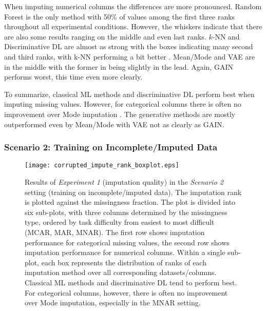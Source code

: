 When imputing numerical columns the differences are more pronounced. Random Forest is the only method with 50\% of values among the first three ranks throughout all experimental conditions. However, the whiskers indicate that there are also some results ranging on the middle and even last ranks. $k$-NN and Discriminative DL are almost as strong with the boxes indicating many second and third ranks, with k-NN performing a bit better . Mean/Mode and VAE are in the middle with the former in being slightly in the lead.  Again, GAIN performs worst, this time even more clearly.

To summarize, classical ML methods and discriminative DL perform best when imputing missing values. However, for categorical columns there is often no improvement over Mode imputation . The generative methods are mostly outperformed even by Mean/Mode with VAE not as clearly as GAIN.


\subsubsection{Scenario 2: Training on Incomplete/Imputed Data}


\begin{figure}\centering
    \texttt{[image: corrupted\_impute\_rank\_boxplot.eps]}

    \caption[Imputation Ranks - Corrupted]{Results of \textit{Experiment 1} (imputation quality) in the \textit{Scenario 2} setting (training on incomplete/imputed data). The imputation rank is plotted against the missingness fraction. The plot is divided into six sub-plots, with three columns determined by the missingness type, ordered by task difficulty from easiest to most difficult (MCAR, MAR, MNAR). The first row shows imputation performance for categorical missing values,  the second row shows imputation performance for numerical columns. Within a single sub-plot, each box represents the distribution of ranks of each imputation method over all corresponding datasets/columns. Classical ML methods and discriminative DL tend to perform best. For categorical columns, however, there is often no improvement over Mode imputation, especially in the MNAR setting.
    }
	\label{fig:corrupted_impute_rank_boxplot}
\end{figure}

